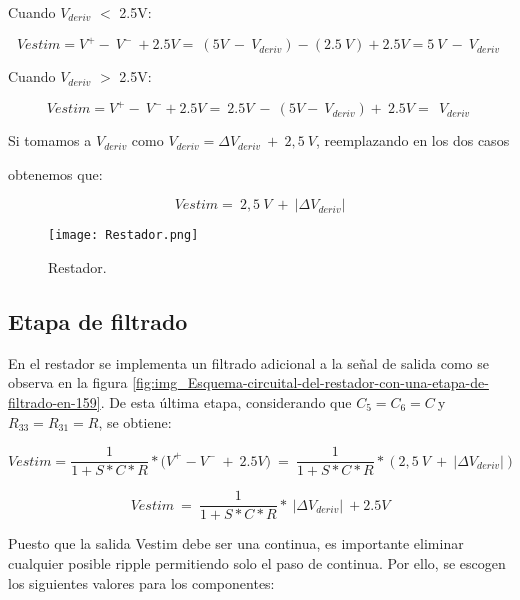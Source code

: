 \noindent Cuando $V_{deriv}$ $\mathrm{<}$ 2.5V:

\begin{equation} \label{eq_rest_1}
	Vestim=V^+-\ V^-\ +2.5V=\ (5V\ -\ V_{deriv})-(2.5\ V)+2.5V=5\ V\ -\ V_{deriv}\  
\end{equation}

\noindent Cuando $V_{deriv}$ $\mathrm{>}$ 2.5V: 

\begin{equation} \label{eq_rest_2}
	{Vestim=V}^+-\ V^-+2.5V=\ 2.5V\ -\ (5V-\ V_{deriv})+\ 2.5V=\ \ V_{deriv}\ 
\end{equation}

\noindent Si tomamos a $V_{deriv}$ como $V_{deriv}=\mathit{\Delta}V_{deriv}\ +\ 2,5\ V$, reemplazando en los dos casos

\noindent obtenemos que:

\begin{equation} \label{eq_rest_3}
	Vestim=\ 2,5\ V\ +\ |\mathit{\Delta}V_{deriv}|
\end{equation}

\begin{figure}[H]
	\centering
	\texttt{[image: Restador.png]}
	\caption{Restador.}
	\label{fig:img_Restador}
\end{figure}

\subsection{Etapa de filtrado}

\noindent En el restador se implementa un filtrado adicional a la se\~{n}al de salida como se observa en la figura  \ref{fig:img_Esquema-circuital-del-restador-con-una-etapa-de-filtrado-en-159}. De esta \'{u}ltima etapa, considerando que $C_5=C_6=C\ $y $R_{33}=R_{31}=R$, se obtiene:

\begin{equation} \label{eq_Vestim_1}
	{Vestim}=\frac{1}{1+S*C*R}*{(V}^+-V^-\ +\ 2.5V)\ =\ \frac{1}{1+S*C*R}*(2,5\ V\ +\ |\mathit{\Delta}V_{deriv}|)
\end{equation}

\begin{equation} \label{eq_Vestim_2}
	Vestim\ =\ \frac{1}{1+S*C*R}*\ |\mathit{\Delta}V_{deriv}|\ +2.5V
\end{equation}



\noindent Puesto que la salida Vestim debe ser una continua, es importante eliminar cualquier posible ripple permitiendo solo el paso de continua. Por ello, se escogen los siguientes valores para los componentes:

